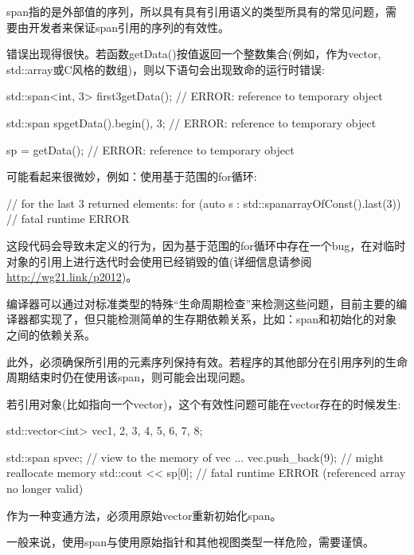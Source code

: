 span指的是外部值的序列，所以具有具有引用语义的类型所具有的常见问题，需要由开发者来保证span引用的序列的有效性。

错误出现得很快。若函数getData()按值返回一个整数集合(例如，作为vector, std::array或C风格的数组)，则以下语句会出现致命的运行时错误:

\begin{cpp}
std::span<int, 3> first3{getData()}; // ERROR: reference to temporary object

std::span sp{getData().begin(), 3}; // ERROR: reference to temporary object

sp = getData(); // ERROR: reference to temporary object
\end{cpp}

可能看起来很微妙，例如：使用基于范围的for循环:

\begin{cpp}
// for the last 3 returned elements:
for (auto s : std::span{arrayOfConst()}.last(3)) // fatal runtime ERROR
\end{cpp}

这段代码会导致未定义的行为，因为基于范围的for循环中存在一个bug，在对临时对象的引用上进行迭代时会使用已经销毁的值(详细信息请参阅\url{http://wg21.link/p2012})。

编译器可以通过对标准类型的特殊“生命周期检查”来检测这些问题，目前主要的编译器都实现了，但只能检测简单的生存期依赖关系，比如：span和初始化的对象之间的依赖关系。

此外，必须确保所引用的元素序列保持有效。若程序的其他部分在引用序列的生命周期结束时仍在使用该span，则可能会出现问题。

若引用对象(比如指向一个vector)，这个有效性问题可能在vector存在的时候发生:

\begin{cpp}
std::vector<int> vec{1, 2, 3, 4, 5, 6, 7, 8};

std::span sp{vec}; // view to the memory of vec
...
vec.push_back(9); // might reallocate memory
std::cout << sp[0]; // fatal runtime ERROR (referenced array no longer valid)
\end{cpp}

作为一种变通方法，必须用原始vector重新初始化span。

一般来说，使用span与使用原始指针和其他视图类型一样危险，需要谨慎。


































